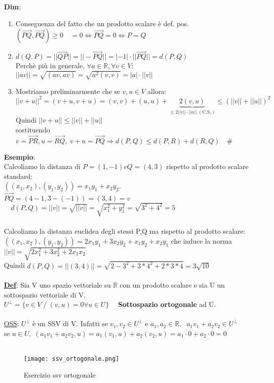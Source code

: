 \documentclass[12pt]{article}
\begin{document}
\noindent \textbf{Dim}:
\begin{enumerate}
    \item Conseguenza del fatto che un prodotto scalare è def. pos.\\
    $(\overrightarrow{PQ}, \overrightarrow{PQ}) \ge 0 \quad = 0 \iff \overrightarrow{PQ} = 0 \iff P = Q$
    \item $d(Q,P) = ||\overrightarrow{QP}|| = ||-\overrightarrow{PQ}|| = |-1|\cdot||\overrightarrow{PQ}|| = d(P,Q)$\\
    Perchè più in generale, $\forall a\in \mathbb{R}, \forall v \in V:$\\
    $||av|| = \sqrt{(av,av)} = \sqrt{a^2(v,v)} = |a|\cdot ||v||$
    \item Mostriamo preliminarmente che se $v,u \in V$ allora:\\
    $||v+u||^2 = (v+u, v+u) = (v,v) + (u,u) + \underbrace{2(v,u)}_{\leq 2||v||\cdot ||u|| \;(\text{C.S.})} \leq (||v||+||u||)^2   $\\
    Quindi $||v+u|| \leq ||v|| + ||u||$\\
    sostituendo $v = \overrightarrow{PR}, u = \overrightarrow{RQ},\; v+u = \overrightarrow{PQ} \Rightarrow d(P,Q) \le d(P,R) + d(R,Q)\quad \#$
\end{enumerate}
\textbf{Esempio}:\\
Calcoliamo la distanza di $P = (1,-1) e Q = (4,3)$ rispetto al prodotto scalare standard:\\
$((x_1,x_2),(y_1,y_2)) = x_1y_1+x_2y_2$.\\
$\overrightarrow{PQ} = (4-1, 3-(-1)) = (3,4) = v$\\
$ \quad d(P,Q) = ||v|| = \sqrt{||v||} = \sqrt{x_1^2 + y_1^2} = \sqrt{3^2+4^2} = 5$\\\\
Calcoliamo la distanza euclidea degli stessi P,Q ma rispetto al prodotto scalare: \\
$((x_1,x_2),(y_1,y_2)) = 2x_1y_1+3x_2y_2+x_1y_2+x_2y_1$ che induce la norma $||v|| = \sqrt{2x_1^2+3x_2^2+2x_1x_2}$\\
Quindi $d(P,Q) = ||(3,4)|| = \sqrt{2-3^2+3*4^2+2*3*4} = 3\sqrt{10}$\\\\
\textbf{\underline{Def}}: Sia V uno spazio vettoriale su $\mathbb{R}$ con un prodotto scalare e sia U un sottospazio vettoriale di V.\\
$U^{\bot} = \{v \in V\;/\; (v,u) = 0 \forall u \in U\}\quad$ \textbf{Sottospazio ortogonale} ad U.\\\\
\underline{OSS}: $U^{\bot}$ è un SSV di V. Infatti se $v_1,v_2 \in U^{\bot}$ e $a_1,a_2 \in \mathbb{R},\;$
$a_1v_1+a_2v_2\in U^{\bot}$\\
se $u \in U,\; (a_1v_1+a_2v_2,u) = a_1(v_1,u)+a_2(v_2,u) = a_1\cdot 0+ a_2\cdot 0 = 0$\\\\
\begin{figure}[!h]
    \centering
    \texttt{[image: ssv\_ortogonale.png]}
    \caption{Esercizio ssv ortogonale}
    \label{esercizio_ssv_ortogonale}
\end{figure}
\end{document}
